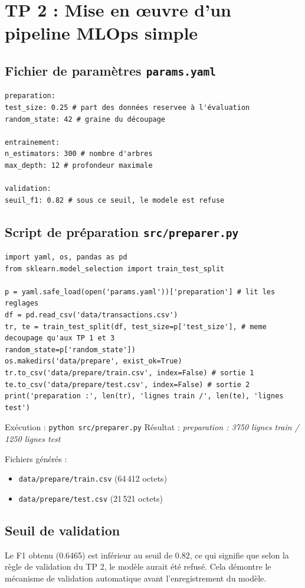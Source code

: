 \documentclass[12pt,a4paper]{report}
\begin{document}
\chapter{TP 2 : Mise en œuvre d'un pipeline MLOps simple}

\section{Fichier de paramètres \texttt{params.yaml}}
\begin{verbatim}
preparation:
test_size: 0.25 # part des données reservee à l'évaluation
random_state: 42 # graine du découpage

entrainement:
n_estimators: 300 # nombre d'arbres
max_depth: 12 # profondeur maximale

validation:
seuil_f1: 0.82 # sous ce seuil, le modele est refuse
\end{verbatim}

\section{Script de préparation \texttt{src/preparer.py}}
\begin{verbatim}
import yaml, os, pandas as pd
from sklearn.model_selection import train_test_split

p = yaml.safe_load(open('params.yaml'))['preparation'] # lit les reglages
df = pd.read_csv('data/transactions.csv')
tr, te = train_test_split(df, test_size=p['test_size'], # meme decoupage qu'aux TP 1 et 3
random_state=p['random_state'])
os.makedirs('data/prepare', exist_ok=True)
tr.to_csv('data/prepare/train.csv', index=False) # sortie 1
te.to_csv('data/prepare/test.csv', index=False) # sortie 2
print('preparation :', len(tr), 'lignes train /', len(te), 'lignes test')
\end{verbatim}
Exécution : \texttt{python src/preparer.py}
Résultat : \textit{preparation : 3750 lignes train / 1250 lignes test}

Fichiers générés :
\begin{itemize}
    \item \texttt{data/prepare/train.csv} (64\,412 octets)
    \item \texttt{data/prepare/test.csv} (21\,521 octets)
\end{itemize}

\section{Seuil de validation}
Le F1 obtenu (0.6465) est inférieur au seuil de 0.82, ce qui signifie que selon la règle de validation du TP 2, le modèle aurait été refusé. Cela démontre le mécanisme de validation automatique avant l'enregistrement du modèle.
\end{document}
